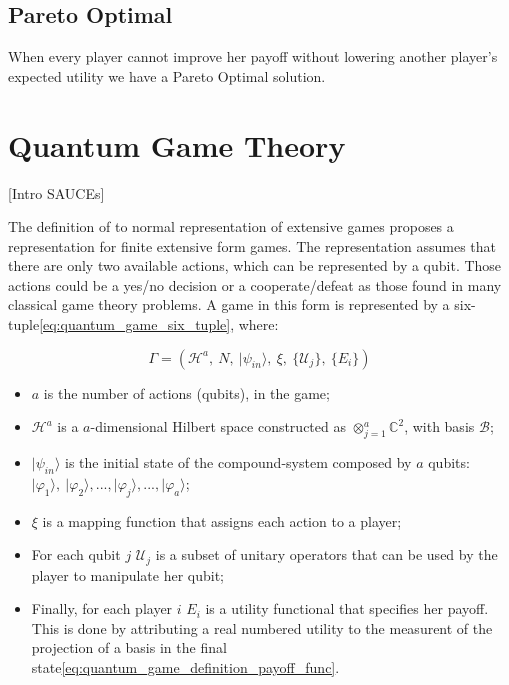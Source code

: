 \subsection{Pareto Optimal}
\label{subsec:background:game_theory_pareto_optimal}

When every player cannot improve her payoff without lowering another player's expected utility we have a Pareto Optimal solution.





\section{Quantum Game Theory}
\label{sec:background_quantum_game_theory}

[Intro SAUCEs]

The definition of to normal representation of extensive games proposes a representation
for finite extensive form games\cite{Fra2011}. The representation assumes that there
are only two available actions, which can be represented by a qubit.
Those actions could be a yes/no decision or a cooperate/defeat as
those found in many classical game theory problems. A game in this
form is represented by a six-tuple\ref{eq:quantum_game_six_tuple},
where:

\begin{equation}
\Gamma=(\mathcal{H}^{a},\: N,\:\vert\psi_{in}\rangle,\:\xi,\:\{\mathcal{U}_{j}\},\:\{E_{i}\})\label{eq:quantum_game_six_tuple}
\end{equation}

\begin{itemize}
\item $a$ is the number of actions (qubits), in the game; 
\item $\mathcal{H}^{a}$ is a $a$-dimensional Hilbert space constructed
as $\otimes_{j=1}^{a}\mathbb{C}^{2}$, with basis $\mathcal{B}$;
\item $\vert\psi_{in}\rangle$ is the initial state of the compound-system
composed by $a$ qubits: $\vert\varphi_{1}\rangle,\:\vert\varphi_{2}\rangle, ..., \vert\varphi_{j}\rangle, ..., \vert\varphi_{a}\rangle$;
\item $\xi$ is a mapping function that assigns each action to a player;
\item For each qubit $j$ $\mathcal{U}_{j}$ is a subset of unitary operators
that can be used by the player to manipulate her qubit;
\item Finally, for each player $i$ $E_{i}$ is a utility functional that
specifies her payoff. This is done by attributing a real numbered utility to the measurent of the projection of a basis in the final state\ref{eq:quantum_game_definition_payoff_func}.\end{itemize}


